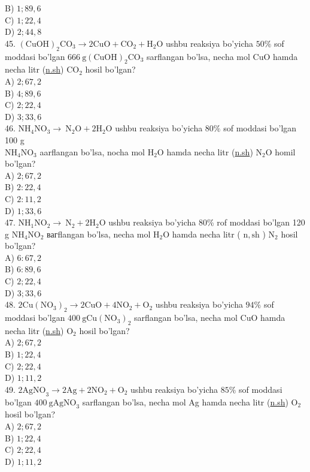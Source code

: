 B) $1 ; 89,6$\\
C) $1 ; 22,4$\\
D) $2 ; 44,8$\\
45. $(\mathrm{CuOH})_{2} \mathrm{CO}_{3} \rightarrow 2 \mathrm{CuO}+\mathrm{CO}_{2}+\mathrm{H}_{2} \mathrm{O}$ ushbu reaksiya bo'yicha $50 \%$ sof moddasi bo'lgan $666 \mathrm{~g}(\mathrm{CuOH})_{2} \mathrm{CO}_{3}$ sarflangan bo'lsa, necha mol CuO hamda necha litr (\href{http://n.sh}{n.sh}) $\mathrm{CO}_{2}$ hosil bo'lgan?\\
A) $2 ; 67,2$\\
B) $4 ; 89,6$\\
C) $2 ; 22,4$\\
D) $3 ; 33,6$\\
46. $\mathrm{NH}_{4} \mathrm{NO}_{3} \rightarrow \mathrm{~N}_{2} \mathrm{O}+2 \mathrm{H}_{2} \mathrm{O}$ ushbu reaksiya bo'yicha $80 \%$ sof moddasi bo'lgan 100 g\\
$\mathrm{NH}_{4} \mathrm{NO}_{3}$ aarflangan bo'lsa, nocha mol $\mathrm{H}_{2} \mathrm{O}$ hamda necha litr (\href{http://n.sh}{n.sh}) $\mathrm{N}_{2} \mathrm{O}$ homil bo'lgan?\\
A) $2 ; 67,2$\\
B) $2: 22,4$\\
C) $2: 11,2$\\
D) $1 ; 33,6$\\
47. $\mathrm{NH}_{1} \mathrm{NO}_{2} \rightarrow \mathrm{~N}_{2}+2 \mathrm{H}_{2} \mathrm{O}$ ushbu reaksiya bo'yicha 80\% rof moddasi bo'lgan 120 g $\mathrm{NH}_{4} \mathrm{NO}_{2}$ вагflangan bo'lsa, necha mol $\mathrm{H}_{2} \mathrm{O}$ hamda necha litr ( $\mathrm{n}, \mathrm{sh}$ ) $\mathrm{N}_{2}$ hosil bo'lgan?\\
A) $6: 67,2$\\
B) $6: 89,6$\\
C) $2 ; 22,4$\\
D) $3 ; 33,6$\\
48. $2 \mathrm{Cu}\left(\mathrm{NO}_{3}\right)_{2} \rightarrow 2 \mathrm{CuO}+4 \mathrm{NO}_{2}+\mathrm{O}_{2}$ ushbu reaksiya bo'yicha $94 \%$ sof moddasi bo'lgan $400 \mathrm{~g} \mathrm{Cu}\left(\mathrm{NO}_{3}\right)_{2}$ sarflangan bo'lsa, necha mol CuO hamda necha litr (\href{http://n.sh}{n.sh}) $\mathrm{O}_{2}$ hosil bo'lgan?\\
A) $2 ; 67,2$\\
B) $1 ; 22,4$\\
C) $2 ; 22,4$\\
D) $1 ; 11,2$\\
49. $2 \mathrm{AgNO}_{3} \rightarrow 2 \mathrm{Ag}+2 \mathrm{NO}_{2}+\mathrm{O}_{2}$ ushbu reaksiya bo'yicha $85 \%$ sof moddasi bo'lgan $400 \mathrm{~g} \mathrm{AgNO}_{3}$ sarflangan bo'lsa, necha mol Ag hamda necha litr (\href{http://n.sh}{n.sh}) $\mathrm{O}_{2}$ hosil bo'lgan?\\
A) $2 ; 67,2$\\
B) $1 ; 22,4$\\
C) $2 ; 22,4$\\
D) $1 ; 11,2$

